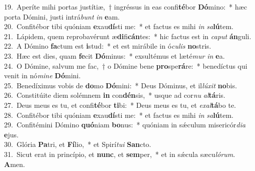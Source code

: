 {19.~}Aperíte mihi portas justítiæ,~† ingréssus in eas confi\textbf{té}bor \textbf{Dó}mino:~* hæc porta Dómini, justi intrá\textit{bunt} \textit{in} \textbf{e}am.\\
{20.~}Confitébor tibi quóniam \textbf{e}xau\textbf{dí}sti me:~* et factus es mihi \textit{in} \textit{sa}\textbf{lú}tem.\\
{21.~}Lápidem, quem reprobavérunt æ\textbf{di}fi\textbf{cán}tes:~* hic factus est in \textit{ca}\textit{put} \textbf{án}guli.\\
{22.~}A Dómino \textbf{fa}ctum est \textbf{i}stud:~* et est mirábile in ó\textit{cu}\textit{lis} \textbf{no}stris.\\
{23.~}Hæc est dies, quam \textbf{fe}cit \textbf{Dó}minus:~* exsultémus et læté\textit{mur} \textit{in} \textbf{e}a.\\
{24.~}O Dómine, salvum me fac,~† o Dómine bene \textbf{pro}spe\textbf{rá}re:~* benedíctus qui venit in nó\textit{mi}\textit{ne} \textbf{Dó}mini.\\
{25.~}Benedíximus vobis de \textbf{do}mo \textbf{Dó}mini:~* Deus Dóminus, et il\textit{lú}\textit{xit} \textbf{no}bis.\\
{26.~}Constitúite diem solémnem \textbf{in} con\textbf{dén}sis,~* usque ad cor\textit{nu} \textit{al}\textbf{tá}ris.\\
{27.~}Deus meus es tu, et confi\textbf{té}bor \textbf{ti}bi:~* Deus meus es tu, et \textit{e}\textit{xal}\textbf{tá}bo te.\\
{28.~}Confitébor tibi quóniam \textbf{e}xau\textbf{dí}sti me:~* et factus es mihi \textit{in} \textit{sa}\textbf{lú}tem.\\
{29.~}Confitémini Dómino \textbf{quó}niam \textbf{bo}nus:~* quóniam in sǽculum misericór\textit{di}\textit{a} \textbf{e}jus.\\
{30.~}Glória \textbf{Pa}tri, et \textbf{Fí}lio,~* et Spirí\textit{tu}\textit{i} \textbf{San}cto.\\
{31.~}Sicut erat in princípio, et \textbf{nunc}, et \textbf{sem}per,~* et in sǽcula sæcu\textit{ló}\textit{rum}. \textbf{A}men.\\
